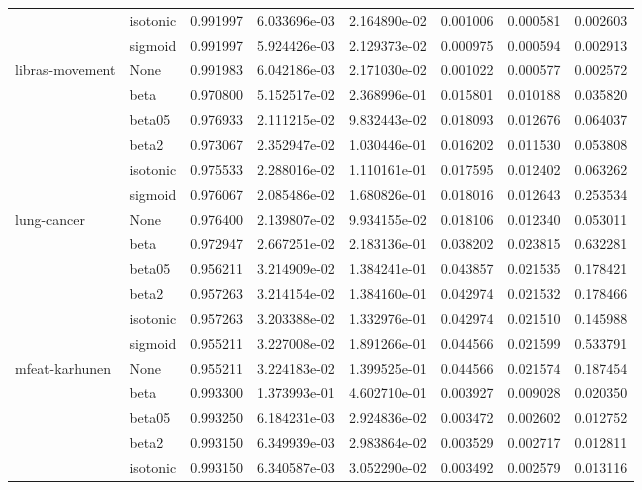 \begin{tabular}{llrrrrrr}
        & isotonic &  0.991997 &  6.033696e-03 &  2.164890e-02 &  0.001006 &  0.000581 &  0.002603 \\
        & sigmoid &  0.991997 &  5.924426e-03 &  2.129373e-02 &  0.000975 &  0.000594 &  0.002913 \\
libras-movement & None &  0.991983 &  6.042186e-03 &  2.171030e-02 &  0.001022 &  0.000577 &  0.002572 \\
        & beta &  0.970800 &  5.152517e-02 &  2.368996e-01 &  0.015801 &  0.010188 &  0.035820 \\
        & beta05 &  0.976933 &  2.111215e-02 &  9.832443e-02 &  0.018093 &  0.012676 &  0.064037 \\
        & beta2 &  0.973067 &  2.352947e-02 &  1.030446e-01 &  0.016202 &  0.011530 &  0.053808 \\
        & isotonic &  0.975533 &  2.288016e-02 &  1.110161e-01 &  0.017595 &  0.012402 &  0.063262 \\
        & sigmoid &  0.976067 &  2.085486e-02 &  1.680826e-01 &  0.018016 &  0.012643 &  0.253534 \\
lung-cancer & None &  0.976400 &  2.139807e-02 &  9.934155e-02 &  0.018106 &  0.012340 &  0.053011 \\
        & beta &  0.972947 &  2.667251e-02 &  2.183136e-01 &  0.038202 &  0.023815 &  0.632281 \\
        & beta05 &  0.956211 &  3.214909e-02 &  1.384241e-01 &  0.043857 &  0.021535 &  0.178421 \\
        & beta2 &  0.957263 &  3.214154e-02 &  1.384160e-01 &  0.042974 &  0.021532 &  0.178466 \\
        & isotonic &  0.957263 &  3.203388e-02 &  1.332976e-01 &  0.042974 &  0.021510 &  0.145988 \\
        & sigmoid &  0.955211 &  3.227008e-02 &  1.891266e-01 &  0.044566 &  0.021599 &  0.533791 \\
mfeat-karhunen & None &  0.955211 &  3.224183e-02 &  1.399525e-01 &  0.044566 &  0.021574 &  0.187454 \\
        & beta &  0.993300 &  1.373993e-01 &  4.602710e-01 &  0.003927 &  0.009028 &  0.020350 \\
        & beta05 &  0.993250 &  6.184231e-03 &  2.924836e-02 &  0.003472 &  0.002602 &  0.012752 \\
        & beta2 &  0.993150 &  6.349939e-03 &  2.983864e-02 &  0.003529 &  0.002717 &  0.012811 \\
        & isotonic &  0.993150 &  6.340587e-03 &  3.052290e-02 &  0.003492 &  0.002579 &  0.013116 \\

\end{tabular}
